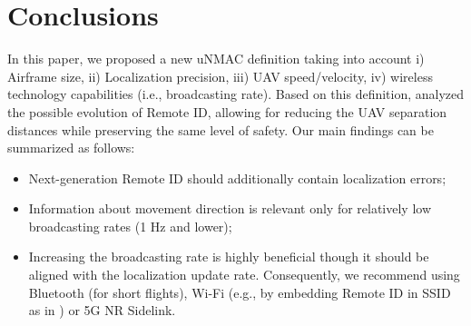 \documentclass[10pt,conference]{IEEEtran}
\begin{document}
\section{Conclusions}
In this paper, we proposed a new uNMAC definition taking into account i) Airframe size, ii) Localization precision, iii) UAV speed/velocity, iv) wireless technology capabilities (i.e., broadcasting rate). Based on this definition, analyzed the possible evolution of Remote ID, allowing for reducing the UAV separation distances while preserving the same level of safety. Our main findings can be summarized as follows:
\begin{itemize}
    \item Next-generation Remote ID should additionally contain localization errors;
    \item Information about movement direction is relevant only for relatively low broadcasting rates (1 Hz and lower);
    \item Increasing the broadcasting rate is highly beneficial though it should be aligned with the localization update rate. Consequently, we recommend using Bluetooth (for short flights), Wi-Fi (e.g., by embedding Remote ID in SSID as in \cite{9133405}) or 5G NR Sidelink.




\end{itemize}



\vspace{12pt}
\color{red}
\end{document}
